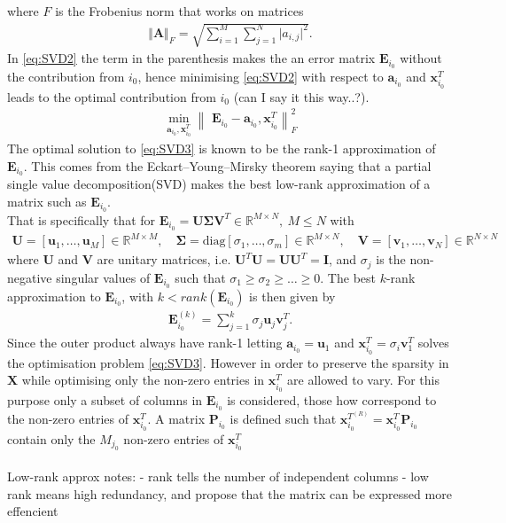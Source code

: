 where $F$ is the Frobenius norm that works on matrices
\begin{align*}
\Vert \mathbf{A} \Vert_F = \sqrt{\sum_{i=1}^M \sum_{j=1}^N \vert a_{i,j} \vert^2}.
\end{align*} 
In \eqref{eq:SVD2} the term in the parenthesis makes the an error matrix $\textbf{E}_{i_0}$ without the contribution from $i_{0}$, hence minimising \eqref{eq:SVD2} with respect to $\textbf{a}_{i_{0}}$ and $\textbf{x}_{i_{0}}^{T}$ leads to the optimal contribution from $i_{0}$ (can I say it this way..?). 
\begin{align}
\min_{\textbf{a}_{i_{0}},\textbf{x}_{i_0}^{T}}\left\|\textbf{ E}_{i_{0}}-\textbf{a}_{i_{0}},\textbf{x}_{i_0}^{T} \right\|_{F}^{2}\label{eq:SVD3}
\end{align} 
The optimal solution to \eqref{eq:SVD3} is known to be the rank-1 approximation of $\textbf{E}_{i_{0}}$. This comes from the Eckart–Young–Mirsky theorem\cite{?} saying that a partial single value decomposition(SVD) makes the best low-rank approximation of a matrix such as $\textbf{E}_{i_0}$.\\
That is specifically that for $\textbf{E}_{i_0}=\textbf{U}\boldsymbol{\Sigma}\textbf{V}^T\in \mathbb{R}^{M\times N},\ M \leq N$ with 
\begin{align*}
\textbf{U}=\left[\textbf{u}_1, \hdots, \textbf{u}_M\right] \in \mathbb{R}^{M\times M}, \quad \boldsymbol{\Sigma}=\text{diag}\left[\sigma_1, \hdots , \sigma_m \right] \in \mathbb{R}^{M\times N}, \quad \textbf{V}=\left[\textbf{v}_1, \hdots, \textbf{v}_N\right] \in \mathbb{R}^{N\times N} 
\end{align*}  
where $\textbf{U}$ and $\textbf{V}$ are unitary matrices, i.e. $\textbf{U}^T\textbf{U}=\textbf{UU}^T=\textbf{I}$, and $\sigma_j$ is the non-negative singular values of $\textbf{E}_{i_0}$ such that $\sigma_1\geq \sigma_2 \geq \hdots \geq 0$. The best $k$-rank approximation to $\textbf{E}_{i_0}$, with $k< rank(\textbf{E}_{i_0})$ is then given by\cite{Wiki..} 
\begin{align*}
\textbf{E}_{i_{0}}^{(k)}= \sum_{j=1}^{k}\sigma_j\textbf{u}_{j}\textbf{v}_{j}^T.
\end{align*} 
Since the outer product always have rank-1 letting $\textbf{a}_{i_0}=\textbf{u}_1$ and $\textbf{x}_{i_0}^T = \sigma_{i}\textbf{v}_{1}^T$ solves the optimisation problem \eqref{eq:SVD3}.
However in order to preserve the sparsity in $\textbf{X}$ while optimising only the non-zero entries in $\textbf{x}_{i_0}^T$ are allowed to vary. For this purpose only a subset of columns in $\textbf{E}_{i_0}$ is considered, those how correspond to the non-zero entries of $\textbf{x}_{i_0}^T$. A matrix $\textbf{P}_{i_0}$ is defined such that $\textbf{x}_{i_0}^{T^{(R)}}=\textbf{x}_{i_0}^T\textbf{P}_{i_0} $ contain only the $M_{j_0}$ non-zero entries of $\textbf{x}_{i_0}^T$  
\\ \\
Low-rank approx notes:
- rank tells the number of independent columns 
- low rank means high redundancy, and propose that the matrix can be expressed more effencient
 


